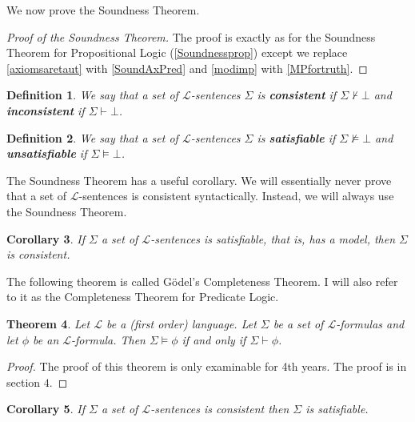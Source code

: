 \documentclass[11pt]{article}
\newcommand{\proves}{\vdash}
\newtheorem{theorem}{Theorem}[section]
\newtheorem{cor}[theorem]{Corollary}
\newtheorem{definition}[theorem]{Definition}
\newcommand{\mcal}[1]{\mathcal{#1}}
\begin{document}
We now prove the Soundness Theorem.

\begin{proof}[Proof of the Soundness Theorem]
The proof is exactly as for the Soundness Theorem for Propositional Logic (\ref{Soundnessprop}) except we replace \ref{axiomsaretaut} with \ref{SoundAxPred} and \ref{modimp} with \ref{MPfortruth}.
\end{proof}


\begin{definition}
We say that a set of $\mcal{L}$-sentences $\Sigma$ is \textbf{consistent} if $\Sigma\nvdash \bot$ and \textbf{inconsistent} if $\Sigma\vdash \bot$.
\end{definition}

\begin{definition}
We say that a set of $\mcal{L}$-sentences $\Sigma$ is \textbf{satisfiable} if $\Sigma \nvDash \bot$ and \textbf{unsatisfiable} if $\Sigma \vDash \bot$.
\end{definition}

The Soundness Theorem has a useful corollary. We will essentially never prove that a set of $\mcal{L}$-sentences is consistent syntactically. Instead, we will always use the Soundness Theorem.

\begin{cor}
If $\Sigma$ a set of $\mcal{L}$-sentences is satisfiable, that is, has a model, then $\Sigma$ is consistent.
\end{cor}

The following theorem is called G\"odel's Completeness Theorem. I will also refer to it as the Completeness Theorem for Predicate Logic.
\begin{theorem}Let $\mcal{L}$ be a (first order) language.
Let $\Sigma$ be a set of $\mcal{L}$-formulas and let $\phi$ be an $\mcal{L}$-formula.
Then $\Sigma\models \phi$ if and only if $\Sigma \proves \phi$.
\end{theorem}

\begin{proof}
The proof of this theorem is only examinable for 4th years. The proof is in section $4$.
\end{proof}

\begin{cor}
If $\Sigma$ a set of $\mcal{L}$-sentences is consistent then $\Sigma$ is satisfiable.
\end{cor}
\end{document}
